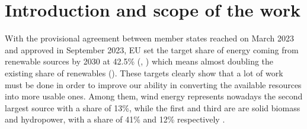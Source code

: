 \newpage
\section{Introduction and scope of the work}\label{sec:b_introduction}
With the provisional agreement between member states reached on March 2023 and approved in September 2023, EU set the target share of energy coming from renewable sources by 2030 at 42.5\% (\cite{rauters}, \cite{EU_targets}) which means almost doubling the existing share of renewables (\cite{EU_targets}). These targets clearly show that a lot of work must be done in order to improve our ability in converting the available resources into more usable ones. Among them, wind energy represents nowadays the second largest source with a share of 13\%, while the first and third are are solid biomass and hydropower, with a share of 41\% and 12\% respectively \cite{ren_share}. 

